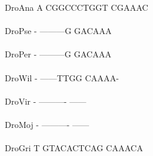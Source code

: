 \documentclass[11pt,twoside,reqno,a4paper]{article}
\begin{document}
{DroAna	A	CGGCCCTGGT	CGAAAC\\
\hspace*{7\charwidth}\hspace*{1\charwidth}\hspace*{1\charwidth}\\
DroPse	-	---------G	GACAAA\\
\hspace*{7\charwidth}\hspace*{1\charwidth}\hspace*{1\charwidth}\\
DroPer	-	---------G	GACAAA\\
\hspace*{7\charwidth}\hspace*{1\charwidth}\hspace*{1\charwidth}\\
DroWil	-	------TTGG	CAAAA-\\
\hspace*{7\charwidth}\hspace*{1\charwidth}\hspace*{1\charwidth}\\
DroVir	-	----------	------\\
\hspace*{7\charwidth}\hspace*{1\charwidth}\hspace*{1\charwidth}\\
DroMoj	-	----------	------\\
\hspace*{7\charwidth}\hspace*{1\charwidth}\hspace*{1\charwidth}\\
DroGri	T	GTACACTCAG	CAAACA\\
\hspace*{7\charwidth}\hspace*{1\charwidth}\hspace*{1\charwidth}\\
\\
}
\end{document}
